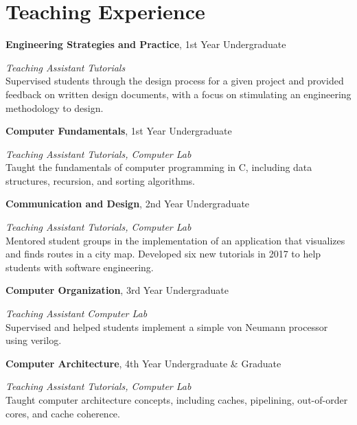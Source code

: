 \section{\sc Teaching Experience}

{\bf Engineering Strategies and Practice}, 1st Year Undergraduate
\vspace{-.3cm}

{\em Teaching Assistant} \hfill {\em Tutorials}\\
Supervised students through the design process for a given project and provided feedback on written design documents, with a focus on stimulating an engineering methodology to design.

{\bf Computer Fundamentals}, 1st Year Undergraduate
\vspace{-.3cm}

{\em Teaching Assistant} \hfill {\em Tutorials, Computer Lab}\\
Taught the fundamentals of computer programming in C, including data structures, recursion, and sorting algorithms.

{\bf Communication and Design}, 2nd Year Undergraduate
\vspace{-.3cm}

{\em Teaching Assistant} \hfill {\em Tutorials, Computer Lab}\\
Mentored student groups in the implementation of an application that visualizes and finds routes in a city map.
Developed six new tutorials in 2017 to help students with software engineering.

{\bf Computer Organization}, 3rd Year Undergraduate
\vspace{-.3cm}

{\em Teaching Assistant} \hfill {\em Computer Lab}\\
Supervised and helped students implement a simple von Neumann processor using verilog.

{\bf Computer Architecture}, 4th Year Undergraduate \& Graduate
\vspace{-.3cm}

{\em Teaching Assistant} \hfill {\em Tutorials, Computer Lab}\\
Taught computer architecture concepts, including caches, pipelining, out-of-order cores, and cache coherence.
